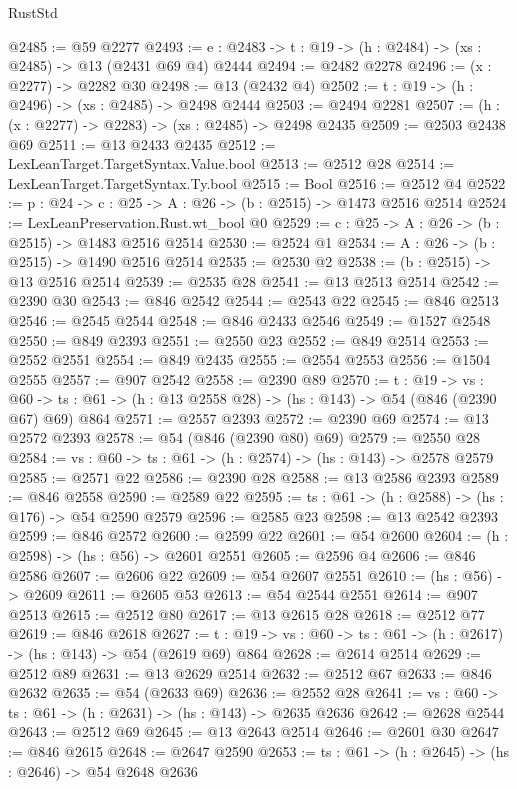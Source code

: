 \begin{lexlean}{RustStd}
\begin{coremodule}
@2485 := @59 @2277
@2493 := {e : @2483} -> {t : @19} -> (h : @2484) -> (xs : @2485) -> @13 (@2431 @69 @4) @2444
@2494 := @2482 @2278
@2496 := (x : @2277) -> @2282 @30
@2498 := @13 (@2432 @4)
@2502 := {t : @19} -> (h : @2496) -> (xs : @2485) -> @2498 @2444
@2503 := @2494 @2281
@2507 := (h : (x : @2277) -> @2283) -> (xs : @2485) -> @2498 @2435
@2509 := @2503 @2438 @69
@2511 := @13 @2433 @2435
@2512 := LexLeanTarget.TargetSyntax.Value.bool
@2513 := @2512 @28
@2514 := LexLeanTarget.TargetSyntax.Ty.bool
@2515 := Bool
@2516 := @2512 @4
@2522 := {p : @24} -> {c : @25} -> {A : @26} -> (b : @2515) -> @1473 @2516 @2514
@2524 := LexLeanPreservation.Rust.wt_bool @0
@2529 := {c : @25} -> {A : @26} -> (b : @2515) -> @1483 @2516 @2514
@2530 := @2524 @1
@2534 := {A : @26} -> (b : @2515) -> @1490 @2516 @2514
@2535 := @2530 @2
@2538 := (b : @2515) -> @13 @2516 @2514
@2539 := @2535 @28
@2541 := @13 @2513 @2514
@2542 := @2390 @30
@2543 := @846 @2542
@2544 := @2543 @22
@2545 := @846 @2513
@2546 := @2545 @2544
@2548 := @846 @2433 @2546
@2549 := @1527 @2548
@2550 := @849 @2393
@2551 := @2550 @23
@2552 := @849 @2514
@2553 := @2552 @2551
@2554 := @849 @2435
@2555 := @2554 @2553
@2556 := @1504 @2555
@2557 := @907 @2542
@2558 := @2390 @89
@2570 := {t : @19} ->
  {vs : @60} -> {ts : @61} -> (h : @13 @2558 @28) -> (hs : @143) -> @54 (@846 (@2390 @67) @69) @864
@2571 := @2557 @2393
@2572 := @2390 @69
@2574 := @13 @2572 @2393
@2578 := @54 (@846 (@2390 @80) @69)
@2579 := @2550 @28
@2584 := {vs : @60} -> {ts : @61} -> (h : @2574) -> (hs : @143) -> @2578 @2579
@2585 := @2571 @22
@2586 := @2390 @28
@2588 := @13 @2586 @2393
@2589 := @846 @2558
@2590 := @2589 @22
@2595 := {ts : @61} -> (h : @2588) -> (hs : @176) -> @54 @2590 @2579
@2596 := @2585 @23
@2598 := @13 @2542 @2393
@2599 := @846 @2572
@2600 := @2599 @22
@2601 := @54 @2600
@2604 := (h : @2598) -> (hs : @56) -> @2601 @2551
@2605 := @2596 @4
@2606 := @846 @2586
@2607 := @2606 @22
@2609 := @54 @2607 @2551
@2610 := (hs : @56) -> @2609
@2611 := @2605 @53
@2613 := @54 @2544 @2551
@2614 := @907 @2513
@2615 := @2512 @80
@2617 := @13 @2615 @28
@2618 := @2512 @77
@2619 := @846 @2618
@2627 := {t : @19} -> {vs : @60} -> {ts : @61} -> (h : @2617) -> (hs : @143) -> @54 (@2619 @69) @864
@2628 := @2614 @2514
@2629 := @2512 @89
@2631 := @13 @2629 @2514
@2632 := @2512 @67
@2633 := @846 @2632
@2635 := @54 (@2633 @69)
@2636 := @2552 @28
@2641 := {vs : @60} -> {ts : @61} -> (h : @2631) -> (hs : @143) -> @2635 @2636
@2642 := @2628 @2544
@2643 := @2512 @69
@2645 := @13 @2643 @2514
@2646 := @2601 @30
@2647 := @846 @2615
@2648 := @2647 @2590
@2653 := {ts : @61} -> (h : @2645) -> (hs : @2646) -> @54 @2648 @2636

\end{coremodule}
\end{lexlean}
